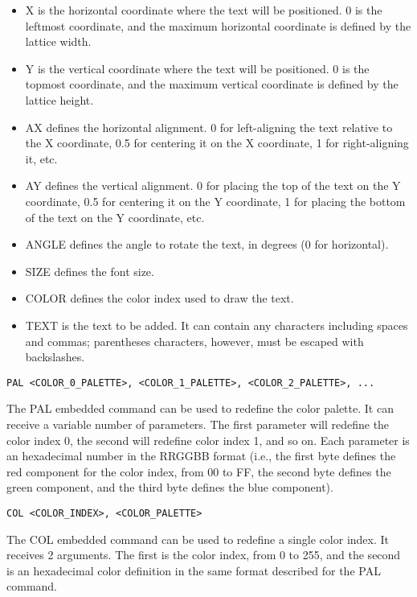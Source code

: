 \documentclass[a4paper]{article}
\begin{document}
\begin{itemize}
  \item X is the horizontal coordinate where the text will be positioned. 0 is the leftmost coordinate, and the maximum horizontal coordinate is defined by the lattice width.
  \item Y is the vertical coordinate where the text will be positioned. 0 is the topmost coordinate, and the maximum vertical coordinate is defined by the lattice height.
  \item AX defines the horizontal alignment. 0 for left-aligning the text relative to the X coordinate, 0.5 for centering it on the X coordinate, 1 for right-aligning it, etc.
  \item AY defines the vertical alignment. 0 for placing the top of the text on the Y coordinate, 0.5 for centering it on the Y coordinate, 1 for placing the bottom of the text on the Y coordinate, etc.
  \item ANGLE defines the angle to rotate the text, in degrees (0 for horizontal).
  \item SIZE defines the font size.
  \item COLOR defines the color index used to draw the text.
  \item TEXT is the text to be added. It can contain any characters including spaces and commas; parentheses characters, however, must be escaped with backslashes.
\end{itemize} 
\bigbreak\bigbreak

\texttt{PAL <COLOR\_0\_PALETTE>, <COLOR\_1\_PALETTE>, <COLOR\_2\_PALETTE>, ...}
\bigbreak

The PAL embedded command can be used to redefine the color palette. It can receive a variable number of parameters. The first parameter will redefine the color index 0, the second will redefine color index 1, and so on. Each parameter is an hexadecimal number in the RRGGBB format (i.e., the first byte defines the red component for the color index, from 00 to FF, the second byte defines the green component, and the third byte defines the blue component).
\bigbreak\bigbreak

\texttt{COL <COLOR\_INDEX>, <COLOR\_PALETTE>}
\bigbreak

The COL embedded command can be used to redefine a single color index. It receives 2 arguments. The first is the color index, from 0 to 255, and the second is an hexadecimal color definition in the same format described for the PAL command.
\bigbreak\bigbreak
\end{document}
